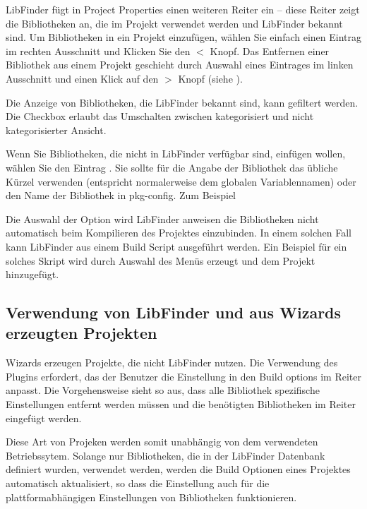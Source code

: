 LibFinder fügt in Project Properties einen weiteren Reiter  ein -- diese Reiter zeigt die Bibliotheken an, die im Projekt verwendet werden und LibFinder bekannt sind. Um Bibliotheken in ein Projekt einzufügen, wählen Sie einfach einen Eintrag im rechten Ausschnitt und Klicken Sie den $<$ Knopf. Das Entfernen einer Bibliothek aus einem Projekt geschieht durch Auswahl eines Eintrages im linken Ausschnitt und einen Klick auf den $>$ Knopf (siehe ).


Die Anzeige von Bibliotheken, die LibFinder bekannt sind, kann gefiltert werden. Die Checkbox  erlaubt das Umschalten zwischen kategorisiert und nicht kategorisierter Ansicht.

Wenn Sie Bibliotheken, die nicht in LibFinder verfügbar sind, einfügen wollen, wählen Sie den Eintrag . Sie sollte für die Angabe der Bibliothek das übliche Kürzel verwenden (entspricht normalerweise dem globalen Variablennamen) oder den Name der Bibliothek in pkg-config. Zum Beispiel


Die Auswahl der Option  wird LibFinder anweisen die Bibliotheken nicht automatisch beim Kompilieren des Projektes einzubinden. In einem solchen Fall kann LibFinder aus einem Build Script ausgeführt werden. Ein Beispiel für ein solches Skript wird durch Auswahl des Menüs  erzeugt und dem Projekt hinzugefügt.

\subsection{Verwendung von LibFinder und aus Wizards erzeugten Projekten}

Wizards erzeugen Projekte, die nicht LibFinder nutzen. Die Verwendung des Plugins erfordert, das der Benutzer die Einstellung in den Build options im Reiter  anpasst. Die Vorgehensweise sieht so aus, dass alle Bibliothek spezifische Einstellungen entfernt werden müssen und die benötigten Bibliotheken im Reiter  eingefügt werden.

Diese Art von Projeken werden somit unabhängig von dem verwendeten Betriebssytem. Solange nur Bibliotheken, die in der LibFinder Datenbank definiert wurden, verwendet werden, werden die Build Optionen eines Projektes automatisch aktualisiert, so dass die Einstellung auch für die plattformabhängigen Einstellungen von Bibliotheken funktionieren.
